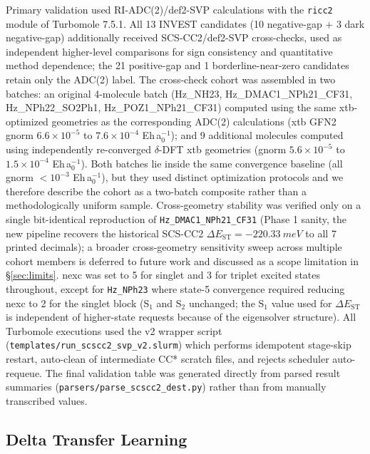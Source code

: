 \documentclass[journal=jcisd8,manuscript=article]{achemso}
\begin{document}
Primary validation used RI-ADC(2)/def2-SVP calculations with the \texttt{ricc2} module of Turbomole 7.5.1.\cite{TURBOMOLE2024} All 13 INVEST candidates (10 negative-gap + 3 dark negative-gap) additionally received SCS-CC2/def2-SVP cross-checks, used as independent higher-level comparisons for sign consistency and quantitative method dependence; the 21 positive-gap and 1 borderline-near-zero candidates retain only the ADC(2) label. The cross-check cohort was assembled in two batches: an original 4-molecule batch (Hz\_NH23, Hz\_DMAC1\_NPh21\_CF31, Hz\_NPh22\_SO2Ph1, Hz\_POZ1\_NPh21\_CF31) computed using the same xtb-optimized geometries as the corresponding ADC(2) calculations (xtb GFN2 gnorm $6.6\!\times\!10^{-5}$ to $7.6\!\times\!10^{-4}$ Eh\,a$_0^{-1}$); and 9 additional molecules computed using independently re-converged $\delta$-DFT xtb geometries (gnorm $5.6\!\times\!10^{-5}$ to $1.5\!\times\!10^{-4}$ Eh\,a$_0^{-1}$). Both batches lie inside the same convergence baseline (all gnorm $<\!10^{-3}$ Eh\,a$_0^{-1}$), but they used distinct optimization protocols and we therefore describe the cohort as a two-batch composite rather than a methodologically uniform sample. Cross-geometry stability was verified only on a single bit-identical reproduction of \texttt{Hz\_DMAC1\_NPh21\_CF31} (Phase 1 sanity, the new pipeline recovers the historical SCS-CC2 $\Delta E_\mathrm{ST}=-\SI{220.33}{meV}$ to all 7 printed decimals); a broader cross-geometry sensitivity sweep across multiple cohort members is deferred to future work and discussed as a scope limitation in \S\ref{sec:limits}. nexc was set to 5 for singlet and 3 for triplet excited states throughout, except for \texttt{Hz\_NPh23} where state-5 convergence required reducing nexc to 2 for the singlet block (S$_1$ and S$_2$ unchanged; the S$_1$ value used for $\Delta E_\mathrm{ST}$ is independent of higher-state requests because of the eigensolver structure). All Turbomole executions used the v2 wrapper script (\texttt{templates/run\_scscc2\_svp\_v2.slurm}) which performs idempotent stage-skip restart, auto-clean of intermediate CC* scratch files, and rejects scheduler auto-requeue. The final validation table was generated directly from parsed result summaries (\texttt{parsers/parse\_scscc2\_dest.py}) rather than from manually transcribed values.

\subsection{Delta Transfer Learning}
\end{document}
